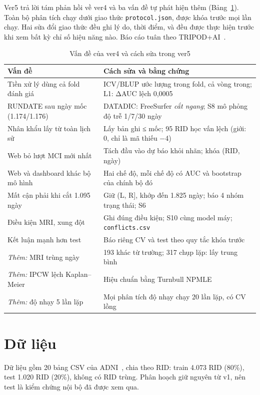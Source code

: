 \documentclass[conference]{IEEEtran}
\begin{document}
Ver5 trả lời tám phản hồi về ver4 và ba vấn đề tự phát hiện thêm (Bảng~\ref{tab:fix}). Toàn bộ phân tích chạy dưới giao thức \texttt{protocol.json}, được khóa trước mọi lần chạy. Hai sửa đổi giao thức đều ghi lý do, thời điểm, và đều được thực hiện trước khi xem bất kỳ chỉ số hiệu năng nào. Báo cáo tuân theo TRIPOD+AI~\cite{tripod}.

\begin{table}[t]
\caption{Vấn đề của ver4 và cách sửa trong ver5}
\label{tab:fix}
\centering\footnotesize
\begin{tabular}{@{}p{}p{}@{}}
\toprule
Vấn đề & Cách sửa và bằng chứng\\
\midrule
Tiền xử lý dùng cả fold đánh giá & ICV/BLUP ước lượng trong fold, cả vòng trong; L1: ΔAUC lệch 0,0005\\
RUNDATE sau ngày mốc (1.174/1.176) & DATADIC: FreeSurfer \emph{cắt ngang}; S8 mô phỏng độ trễ 1/7/30 ngày\\
Nhân khẩu lấy từ toàn lịch sử & Lấy bản ghi ≤ mốc; 95 RID học vấn lệch (giới: 0, chỉ là mã thiếu −4)\\
Web bỏ lượt MCI mới nhất & Tách đầu vào dự báo khỏi nhãn; khóa (RID, ngày)\\
Web và dashboard khác bộ mô hình & Hai chế độ, mỗi chế độ có AUC và bootstrap của chính bộ đó\\
Mất cận phải khi cắt 1.095 ngày & Giữ (L, R], khớp đến 1.825 ngày; báo 4 nhóm trạng thái; S6\\
Điều kiện MRI, xung đột & Ghi đúng điều kiện; S10 cùng model máy; \texttt{conflicts.csv}\\
Kết luận mạnh hơn test & Báo riêng CV và test theo quy tắc khóa trước\\
\emph{Thêm:} MRI trùng ngày & 193 khác từ trường; 317 chụp lặp: lấy trung bình\\
\emph{Thêm:} IPCW lệch Kaplan–Meier & Hiệu chuẩn bằng Turnbull NPMLE\\
\emph{Thêm:} độ nhạy 5 lần lặp & Mọi phân tích độ nhạy chạy 20 lần lặp, có CV lồng\\
\bottomrule
\end{tabular}
\end{table}

\section{Dữ liệu}
Dữ liệu gồm 20 bảng CSV của ADNI~\cite{adni}, chia theo RID: train 4.073 RID (80\%), test 1.020 RID (20\%), không có RID trùng. Phân hoạch giữ nguyên từ v1, nên test là kiểm chứng nội bộ đã được xem qua.
\end{document}
